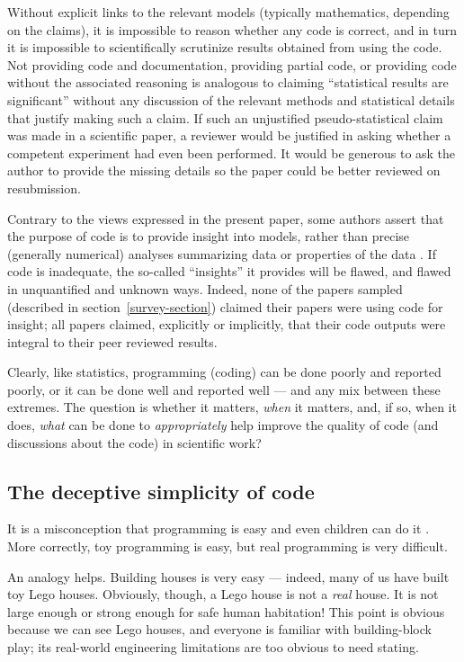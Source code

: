 \documentclass{comjnl}
\begin{document}
Without explicit links to the relevant models (typically mathematics, depending on the claims), it is impossible to reason whether any code is correct, and in turn it is impossible to scientifically scrutinize results obtained from using the code. Not providing code and documentation, providing partial code, or providing code without the associated reasoning is analogous to claiming ``statistical results are significant'' without any discussion of the relevant methods and statistical details that justify making such a claim. If such an unjustified pseudo-statistical claim was made in a scientific paper, a reviewer would be justified in asking whether a competent experiment had even been performed. It would be generous to ask the author to provide the missing details so the paper could be better reviewed on resubmission. 

Contrary to the views expressed in the present paper, some authors assert that the purpose of code is to provide insight into models, rather than precise (generally numerical) analyses summarizing data or properties of the data \cite{assessing-quality}. If code is inadequate, the so-called ``insights'' it provides will be flawed, and flawed in unquantified and unknown ways. Indeed, none of the papers sampled (described in section~\ref{survey-section}) claimed their papers were using code for insight; all papers claimed, explicitly or implicitly, that their code outputs were integral to their peer reviewed results.

Clearly, like statistics, programming (coding) can be done poorly and reported poorly, or it can be done well and reported well --- and any mix between these extremes. The question is whether it matters, \emph{when\/} it matters, and, if so, when it does, \emph{what\/} can be done to \emph{appropriately\/} help improve the quality of code (and discussions about the code) in scientific work?

\subsection{The deceptive simplicity of code}\label{deceptive-simplicity-of-code}
It is a misconception that programming is easy and even children can do it \cite{fixit}. More correctly, toy programming is easy, but real programming is very difficult.

An analogy helps. Building houses is very easy --- indeed, many of us have built toy Lego houses. Obviously, though, a Lego house is not a \emph{real\/} house. It is not large enough or strong enough for safe human habitation! This point is obvious because we can see Lego houses, and everyone is familiar with building-block play; its real-world engineering limitations are too obvious to need stating. 
\end{document}

